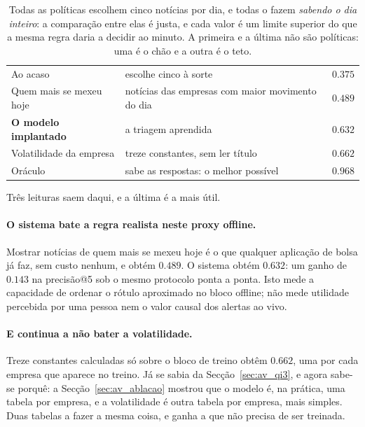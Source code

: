 \begin{table}[ht]
\caption[O sistema contra as alternativas que já existem]{Todas as políticas escolhem cinco
notícias por dia, e todas o fazem \emph{sabendo o dia inteiro}: a comparação entre elas é justa,
e cada valor é um limite superior do que a mesma regra daria a decidir ao minuto. A primeira e a última não são políticas: uma é o chão e a outra é o teto.}
\label{tab:av_pontaaponta}
\centering
\small
\begin{tabular}{L{0.26\textwidth} L{0.38\textwidth} C{0.13\textwidth}}
\toprule
{} &  &  \\
\midrule
Ao acaso & escolhe cinco à sorte & $0.375$\footnotemark{} \\
Quem mais se mexeu hoje & notícias das empresas com maior movimento do dia & $0.489$ \\
\textbf{O modelo implantado} & a triagem aprendida & $\mathbf{0.632}$ \\
Volatilidade da empresa & treze constantes, sem ler título & $\mathbf{0.662}$ \\
\midrule
Oráculo & sabe as respostas: o melhor possível & $0.968$ \\
\bottomrule
\end{tabular}
\end{table}

Três leituras saem daqui, e a última é a mais útil.

\paragraph{O sistema bate a regra realista neste proxy offline.}
Mostrar notícias de quem mais se mexeu hoje é o que qualquer aplicação de bolsa já faz, sem custo
nenhum, e obtém $0.489$. O sistema obtém $0.632$: um ganho de $0.143$ na precisão@5 sob o mesmo
protocolo ponta a ponta. Isto mede a capacidade de ordenar o rótulo aproximado no bloco offline; não
mede utilidade percebida por uma pessoa nem o valor causal dos alertas ao vivo.

\paragraph{E continua a não bater a volatilidade.}
Treze constantes calculadas só sobre o bloco de treino obtêm $0.662$, uma por cada empresa que
aparece no treino. Já se sabia da
Secção~\ref{sec:av_qi3}, e agora sabe-se porquê: a Secção~\ref{sec:av_ablacao} mostrou que o modelo
é, na prática, uma tabela por empresa, e a volatilidade é outra tabela por empresa, mais simples.
Duas tabelas a fazer a mesma coisa, e ganha a que não precisa de ser treinada.

